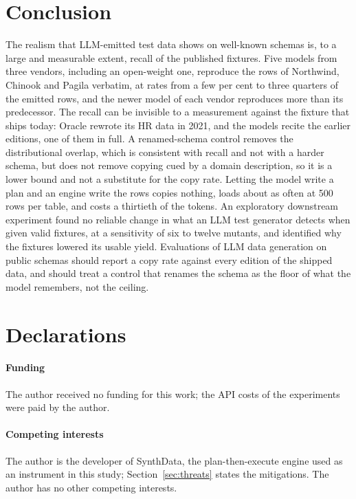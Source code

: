 \documentclass[preprint,12pt]{elsarticle}
\begin{document}
\section{Conclusion}
\label{sec:conclusion}
The realism that LLM-emitted test data shows on well-known schemas is, to a large and measurable extent, recall of the published fixtures. Five models from three vendors, including an open-weight one, reproduce the rows of Northwind, Chinook and Pagila verbatim, at rates from a few per cent to three quarters of the emitted rows, and the newer model of each vendor reproduces more than its predecessor. The recall can be invisible to a measurement against the fixture that ships today: Oracle rewrote its HR data in 2021, and the models recite the earlier editions, one of them in full. A renamed-schema control removes the distributional overlap, which is consistent with recall and not with a harder schema, but does not remove copying cued by a domain description, so it is a lower bound and not a substitute for the copy rate. Letting the model write a plan and an engine write the rows copies nothing, loads about as often at 500 rows per table, and costs a thirtieth of the tokens. An exploratory downstream experiment found no reliable change in what an LLM test generator detects when given valid fixtures, at a sensitivity of six to twelve mutants, and identified why the fixtures lowered its usable yield. Evaluations of LLM data generation on public schemas should report a copy rate against every edition of the shipped data, and should treat a control that renames the schema as the floor of what the model remembers, not the ceiling.

\section*{Declarations}
\paragraph{Funding} The author received no funding for this work; the API costs of the experiments were paid by the author.

\paragraph{Competing interests} The author is the developer of SynthData, the plan-then-execute engine used as an instrument in this study; Section~\ref{sec:threats} states the mitigations. The author has no other competing interests.
\end{document}

